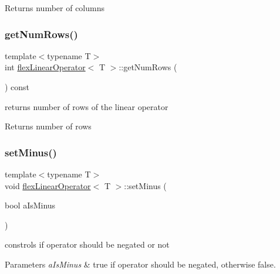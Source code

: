 \begin{DoxyReturn}{Returns}
number of columns 
\end{DoxyReturn}
\mbox{\label{classflex_linear_operator_a6f807b6a0549a79cb22598ab0c42ef21}} 
\subsubsection{\texorpdfstring{get\+Num\+Rows()}{getNumRows()}}
{\footnotesize\ttfamily template$<$typename T$>$ \\
int \hyperlink{classflex_linear_operator}{flex\+Linear\+Operator}$<$ T $>$\+::get\+Num\+Rows (\begin{DoxyParamCaption}{ }\end{DoxyParamCaption}) const\hspace{0.3cm}{\ttfamily [inline]}}



returns number of rows of the linear operator 

\begin{DoxyReturn}{Returns}
number of rows 
\end{DoxyReturn}
\mbox{\label{classflex_linear_operator_a0757a5f739ef85162cfc95e40eeb7784}} 
\subsubsection{\texorpdfstring{set\+Minus()}{setMinus()}}
{\footnotesize\ttfamily template$<$typename T$>$ \\
void \hyperlink{classflex_linear_operator}{flex\+Linear\+Operator}$<$ T $>$\+::set\+Minus (\begin{DoxyParamCaption}\item[{bool}]{a\+Is\+Minus }\end{DoxyParamCaption})\hspace{0.3cm}{\ttfamily [inline]}}



constrols if operator should be negated or not 


\begin{DoxyParams}{Parameters}
{\em a\+Is\+Minus} & true if operator should be negated, otherwise false. \\
\hline
\end{DoxyParams}
\mbox{\label{classflex_linear_operator_add43d72e6e24ff2690fc3f1ea2578818}} 
